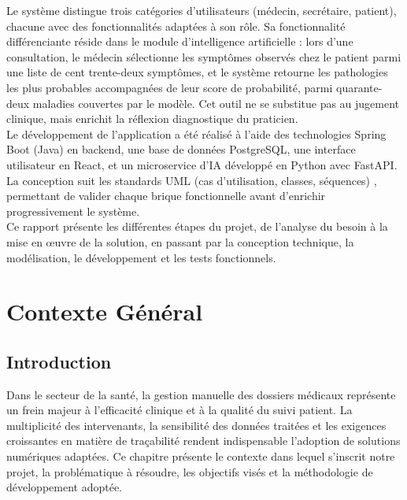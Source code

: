 \documentclass[12pt,a4paper]{report}
\begin{document}
Le système distingue trois catégories d'utilisateurs (médecin, secrétaire, patient), chacune avec des fonctionnalités adaptées à son rôle. Sa fonctionnalité différenciante réside dans le module d'intelligence artificielle : lors d'une consultation, le médecin sélectionne les symptômes observés chez le patient parmi une liste de cent trente-deux symptômes, et le système retourne les pathologies les plus probables accompagnées de leur score de probabilité, parmi quarante-deux maladies couvertes par le modèle. Cet outil ne se substitue pas au jugement clinique, mais enrichit la réflexion diagnostique du praticien.\\

Le développement de l’application a été réalisé à l’aide des technologies Spring Boot (Java) en backend, une base de données PostgreSQL, une interface utilisateur en React, et un microservice d'IA développé en Python avec FastAPI. La conception suit les standards UML (cas d'utilisation, classes, séquences) , permettant de valider chaque brique fonctionnelle avant d'enrichir progressivement le système.\\

Ce rapport présente les différentes étapes du projet, de l’analyse du besoin à la mise
en œuvre de la solution, en passant par la conception technique, la modélisation, le développement et les tests fonctionnels.


\chapter{Contexte Général}

\section*{Introduction}

Dans le secteur de la santé, la gestion manuelle des dossiers médicaux représente un
frein majeur à l'efficacité clinique et à la qualité du suivi patient. La multiplicité des
intervenants, la sensibilité des données traitées et les exigences croissantes en matière de
traçabilité rendent indispensable l'adoption de solutions numériques adaptées. Ce chapitre
présente le contexte dans lequel s'inscrit notre projet, la problématique à résoudre, les
objectifs visés et la méthodologie de développement adoptée.
\end{document}

